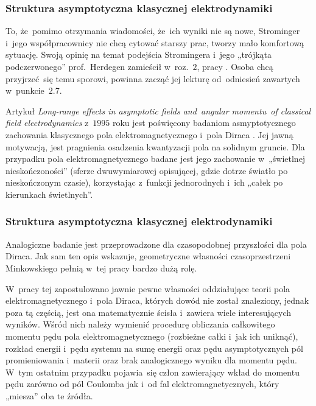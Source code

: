 \documentclass[10pt,t]{beamer}
\begin{document}
\begin{frame}
  \frametitle{Struktura asymptotyczna klasycznej elektrodynamiki}


  To, że~pomimo otrzymania wiadomości, że~ich wyniki nie są nowe,
  Strominger i~jego współpracownicy nie chcą cytować starszy prac,
  tworzy mało komfortową sytuację. Swoją opinię na temat podejścia
  Stromingera i~jego „trójkąta podczerwonego” prof.~Herdegen zamieścił
  w~roz.~$2$, pracy
  \parencite{Herdegen-Infrared-structure-beyond-locality-ETC-Ver-2024}.
  Osoba chcą przyjrzeć~się temu sporowi, powinna zacząć jej lekturę
  od~odniesień zawartych w~punkcie~$2.7$.

  Artykuł 
  {\textit{Long-range effects in asymptotic fields and~angular momentu~of
      classical field electrodynamics}} z~$1995$ roku jest poświęcony
  badaniom asmyptotycznego zachowania klasycznego pola elektromagnetycznego
  i~pola Diraca
  \parencite{Herdegen-Long-range-effects-in-asymptotic-ETC-Pub-1995}.
  Jej jawną motywacją, jest pragnienia osadzenia kwantyzacji pola na
  solidnym gruncie. Dla przypadku pola elektromagnetycznego
  badane jest jego zachowanie w~„świetlnej nieskończoności” (sferze
  dwuwymiarowej opisującej, gdzie dotrze światło po nieskończonym czasie),
  korzystając z~funkcji jednorodnych i~ich „całek po kierunkach świetlnych”.

\end{frame}





\begin{frame}
  \frametitle{Struktura asymptotyczna klasycznej elektrodynamiki}


  Analogiczne badanie jest przeprowadzone dla czasopodobnej przyszłości dla
  pola Diraca. Jak sam ten opis wskazuje, geometryczne własności
  czasoprzestrzeni Minkowskiego pełnią w~tej pracy bardzo dużą rolę.

  W~pracy tej zapostulowano jawnie pewne własności oddziałujące teorii pola
  elektromagnetycznego i~pola Diraca, których dowód nie został znaleziony,
  jednak poza tą częścią, jest ona matematycznie ścisła i~zawiera
  wiele interesujących wyników. Wśród nich należy wymienić procedurę
  obliczania całkowitego momentu pędu
  pola elektromagnetycznego (rozbieżne całki i~jak ich uniknąć), rozkład
  energii i~pędu systemu na sumę energii oraz pędu asymptotycznych pól
  promieniowania i~materii oraz brak analogicznego wyniku dla momentu pędu.
  W~tym ostatnim przypadku pojawia~się człon zawierający wkład do momentu
  pędu zarówno od pól Coulomba jak i~od fal elektromagnetycznych,
  który „miesza” oba te źródła.


\end{frame}
\end{document}
